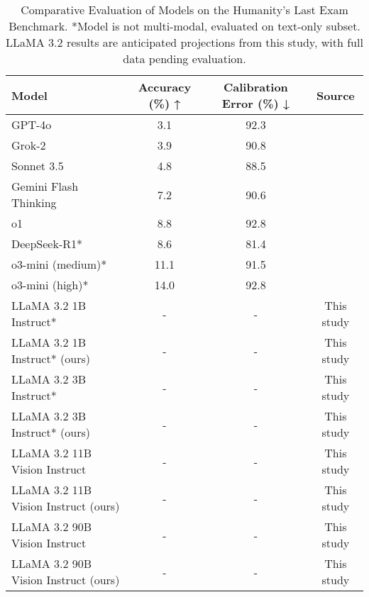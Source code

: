 \vspace*{-\baselineskip}
\vspace*{-\baselineskip}
\begin{table}[H]
  \centering
  \begin{tabular}{lccc}
    \toprule
    Model                   & Accuracy (\%) ↑ & Calibration Error (\%) ↓ & Source \\
    \midrule
    GPT-4o                                 & 3.1             & 92.3                      & \cite{phan2025humanitysexam} \\
    Grok-2                                 & 3.9             & 90.8                      & \cite{phan2025humanitysexam} \\
    Sonnet 3.5                             & 4.8             & 88.5                      & \cite{phan2025humanitysexam} \\
    Gemini Flash Thinking                  & 7.2             & 90.6                      & \cite{phan2025humanitysexam} \\
    o1                                     & 8.8             & 92.8                      & \cite{phan2025humanitysexam} \\
    DeepSeek-R1*                           & 8.6             & 81.4                      & \cite{phan2025humanitysexam} \\
    o3-mini (medium)*                      & 11.1            & 91.5                      & \cite{phan2025humanitysexam} \\
    o3-mini (high)*                        & 14.0            & 92.8                      & \cite{phan2025humanitysexam} \\
    LLaMA 3.2 1B Instruct*                 & -               & -                         & This study \\
    LLaMA 3.2 1B Instruct* (ours)          & -               & -                         & This study \\
    LLaMA 3.2 3B Instruct*                 & -               & -                         & This study \\
    LLaMA 3.2 3B Instruct* (ours)          & -               & -                         & This study \\
    LLaMA 3.2 11B Vision Instruct          & -               & -                         & This study \\
    LLaMA 3.2 11B Vision Instruct (ours)   & -               & -                         & This study \\
    LLaMA 3.2 90B Vision Instruct          & -               & -                         & This study \\
    LLaMA 3.2 90B Vision Instruct (ours)   & -               & -                         & This study \\
    \bottomrule
  \end{tabular}
  \vspace{0.2cm}
  \caption{Comparative Evaluation of Models on the Humanity's Last Exam Benchmark. *Model is not multi-modal, evaluated on text-only subset. LLaMA 3.2 results are anticipated projections from this study, with full data pending evaluation.}
  \label{tab:results}
\end{table}
\vspace*{-\baselineskip}
\vspace*{-\baselineskip}

